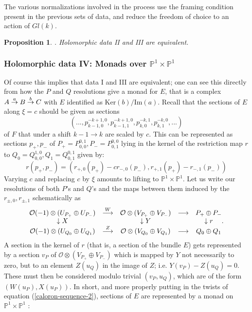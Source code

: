 \documentclass[12pt]{article}
\newtheorem{proposition}[theorem]{Proposition}
\theoremstyle{definition}
\theoremstyle{remark}
\numberwithin{theorem}{section}
\def\bP{{\mathbb {P}}}
\def\pO{{\mathcal O}}
\begin{document}
The various normalizations involved in the process use the framing condition present in the previous sets of data, and reduce the freedom of choice to an action of $Gl(k)$. 

\begin{proposition} \cite[Theorem 5]{Charbonneau:2006gu}. Holomorphic data II and III are equivalent.\end{proposition} 


 \subsubsection{Holomorphic data IV: Monads over $\bP^1\times \bP^1$}
 

Of course this implies that data I and III are equivalent; one can  see this directly from how the $P$ and $Q$ resolutions   give a monad for $E$, that is a complex $A\buildrel{a}\over{\rightarrow} B \buildrel{b}\over{\rightarrow}C$ with $E$ identified as $\mathrm{Ker}(b)/\mathrm{Im}(a)$. Recall that the sections of $E$ along $\xi=c$ should be given as sections 
 $$ (..., p_{k-1,0}^{-k+1,0},p_{k-1,1}^{-k+1,0},p_{k,0}^{-k,1},p_{k ,1}^{-k,0},...)$$ 
 of $F$ that under a shift $k-1\rightarrow k$ are scaled by $c$.  This can be represented as sections  $p_{ +},p_{ -}$ of $P_+ = P_{0,0}^{0,1}, P_-= P^{0,0}_{0,1}$ lying in the kernel of the restriction map $r$ to  $Q_0= Q_{0,0}^{1,0},Q_1= Q_{0 ,1}^{0,1}$ given by:
 $$r(p_{ +},p_{ -})= ( r_{+,0}(p_{ +})-cr_{-,0}(p_{ -}),r_{+,1}(p_{ +})-r_{-,1}(p_{ -}))$$
 Varying $c$ and  replacing $c$ by $\xi$ amounts to lifting to $\bP^1\times\bP^1$.
 Let us write our resolutions of  both $P$'s and $Q$'s and the maps between them   induced by the  $r_{\pm, 0}, r_{\pm, 1}$  schematically as 
$$ \begin{matrix} \pO(-1)\otimes (U_{P_+}\oplus U_{P_-} )& \buildrel {W}\over {\longrightarrow} & \pO\otimes(V_{P_+}\oplus V_{P_-} )&\longrightarrow&P_+\oplus P_-\\
\downarrow X&&\downarrow Y &&\downarrow r\\
 \pO(-1)\otimes(U_{Q_0}\oplus U_{Q_1})& \buildrel {Z}\over {\longrightarrow} & \pO\otimes(V_{Q_0}\oplus V_{Q_1})&\longrightarrow &Q_0\oplus Q_1\end{matrix}.$$
 A section in the kernel of $r$ (that is, a section of the bundle $E$) gets represented by a section $v_P$ of $ \pO\otimes(V_{P_+}\oplus V_{P_-})$ which is mapped by $Y$ not necessarily to zero, but to an element $Z(u_Q)$ in the image of $Z$; i.e. $Y(v_P)-Z(u_Q) = 0$. These must then be considered modulo trivial $(v_P, u_Q)$, which are of the form
 $(W(u_P), X(u_P))$. In short, and more properly putting in the twists of equation (\ref{caloron-sequence-2}), sections of $E$ are represented by a monad on $\bP^1\times \bP^1$ :
 
\end{document}
